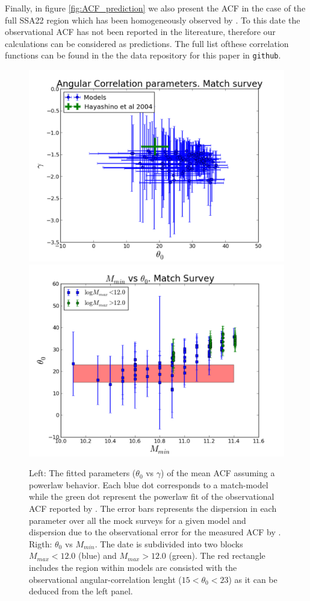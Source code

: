 \documentclass[usenatbib]{mn2e}
\begin{document}
Finally, in figure \ref{fig:ACF_prediction} we also present the ACF 
in the case of the full SSA22 region which has been homogeneously
observed by \citep{Yamada2012}. To
this date the observational ACF has not been reported in the
litereature, therefore our calculations can be considered as
predictions.  The full list ofthese correlation functions can
be found in the the data repository for this paper in \verb"github". 


\begin{figure}
\begin{center}
\includegraphics[width=0.46\linewidth,angle=0]{./plots/power_law_correlation.pdf}
\hspace{5mm}
\includegraphics[width=0.46\linewidth,angle=0]{./plots/mmin_vs_correlation.pdf}
\end{center}
\caption{Left: The fitted parameters  ($\theta_{0}$ vs $\gamma$) of the 
mean ACF  assuming a powerlaw behavior. Each blue dot corresponds to a
match-model while the green dot represent the powerlaw fit of the observational
ACF reported by \citet{Hayashino2004}.  The error bars represents the dispersion
in each parameter over all the mock surveys for a given model and dispersion due
to the observational error for the measured ACF by \citet{Hayashino2004}. Rigth: 
$\theta_{0}$ vs $M_{min}$. The date is subdivided into two blocks $M_{max}<12.0$ 
(blue) and $M_{max}>12.0$ (green). The red rectangle includes the region within
models are consisted with the observational angular-correlation lenght
($15<\theta_{0}<23$) as it can be deduced from the left panel. \label{figure:correlation_parameters}} 
\end{figure} 
\end{document}

